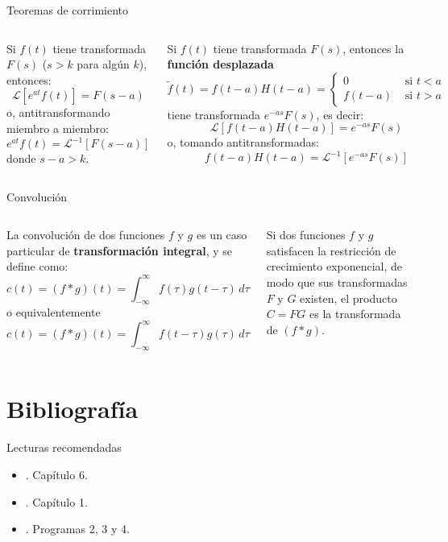\documentclass[9pt, aspectratio=169]{beamer}
\begin{document}
\begin{frame}{Teoremas de corrimiento}
	\begin{columns}[t]
		\cx
		\begin{theorem}[Corrimiento $s$]
			Si $f(t)$ tiene transformada $F(s)$ ($s > k$ para algún $k$), entonces:
			\[ \mathscr{L}[e^{at} f(t)] = F(s -a) \]
			o, antitransformando miembro a miembro:
			\[ e^{at} f(t) = \mathscr{L}^{-1} [F(s -a)] \]
			donde $s - a > k$.
		\end{theorem}

		\cx
		\begin{theorem}[Corrimiento $t$]
			Si $f(t)$ tiene transformada $F(s)$, entonces la \textbf{función desplazada}
			\[ \tilde{f}(t) = f(t - a) H(t - a) =
				\begin{cases}
					0        & \text{ si } t < a \\
					f(t - a) & \text{ si } t > a
				\end{cases}
			\]
			tiene transformada $e^{-a s} F(s)$, es decir:
			\[ \mathscr{L}[f(t - a) H(t - a)] = e^{-a s} F(s) \]
			o, tomando antitransformadas:
			\[ f(t -a) H(t-a) = \mathscr{L}^{-1}[e^{- a s} F(s)] \]
		\end{theorem}
	\end{columns}
\end{frame}

\begin{frame}{Convolución}
	\begin{columns}[t]
		\cx
		La convolución de dos funciones $f$ y $g$ es un caso particular de \textbf{transformación integral}, y se define como:
		\[ c(t) = (f * g)(t) = \int_{-\infty}^{\infty} f(\tau) g(t - \tau) \, d\tau \]
		o equivalentemente
		\[ c(t) = (f * g)(t) = \int_{-\infty}^{\infty} f(t - \tau) g(\tau) \, d\tau \]

		\cx
		\begin{theorem}[Convolución]
			Si dos funciones $f$ y $g$ satisfacen la restricción de crecimiento exponencial, de modo que sus transformadas $F$ y $G$ existen, el producto $C = FG$ es la transformada de $(f * g)$.
		\end{theorem}
	\end{columns}
\end{frame}

\section*{Bibliografía}
\begin{frame}{Lecturas recomendadas}
	\begin{itemize}
		\item {}. Capítulo 6.
		\item {}. Capítulo 1.
		\item {}. Programas 2, 3 y 4.
	\end{itemize}
\end{frame}
\end{document}
